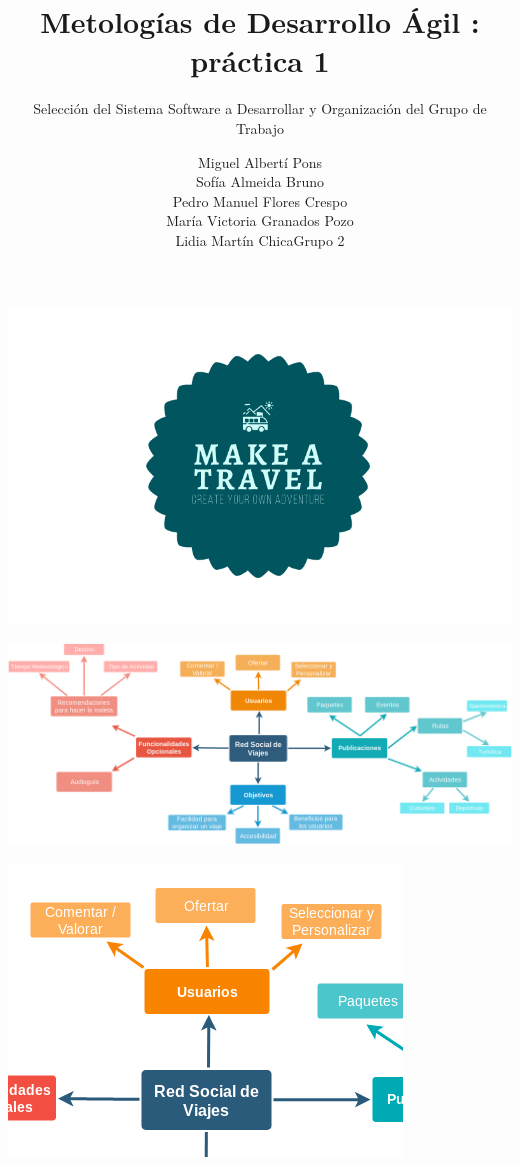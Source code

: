 \documentclass[spanish]{beamer}
\title{Metologías de Desarrollo Ágil : práctica 1}
\subtitle{Selección del Sistema Software a Desarrollar y Organización del Grupo de Trabajo}
\author{Miguel Albertí Pons\\ Sofía Almeida Bruno\\ Pedro Manuel Flores Crespo\\ María Victoria Granados Pozo\\ Lidia Martín Chica\vspace{1em}Grupo 2}
\begin{document}
\maketitle
	
\begin{frame}
\centering
\begin{center}
		\includegraphics[scale=0.4]{../Imagenes/Logo}
	\end{center}
\end{frame}

\begin{frame}
	\begin{center}
		\includegraphics[scale=0.27]{../Imagenes/MapaMentalp1}
	\end{center}
\end{frame}

\begin{frame}
	\begin{center}
		\includegraphics[scale=0.8]{../Imagenes/MM1p1}
	\end{center}
\end{frame}
\end{document}
